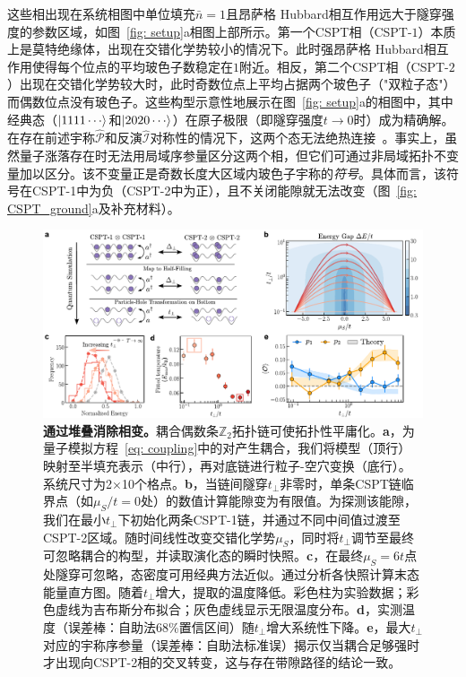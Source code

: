 \documentclass[preprint,superscriptaddress,floatfix, nofootinbib]{revtex4-2}
\begin{document}
这些相出现在系统相图中单位填充$\bar{n} =1$且昂萨格 Hubbard相互作用远大于隧穿强度的参数区域，如图~\ref{fig: setup}a相图上部所示。第一个CSPT相（CSPT-$1$）本质上是莫特绝缘体，出现在交错化学势较小的情况下。此时强昂萨格 Hubbard相互作用使得每个位点的平均玻色子数稳定在$1$附近。相反，第二个CSPT相（CSPT-$2$）出现在交错化学势较大时，此时奇数位点上平均占据两个玻色子（"双粒子态"）而偶数位点没有玻色子。这些构型示意性地展示在图~\ref{fig: setup}a的相图中，其中经典态（$\ket{1111\cdots}$和$\ket{2020\cdots}$）在原子极限（即隧穿强度$t\to 0$时）成为精确解。在存在前述宇称$\hat{\mathcal P}$和反演$\hat{\mathcal I}$对称性的情况下，这两个态无法绝热连接~\cite{Fuji2015}。事实上，虽然量子涨落存在时无法用局域序参量区分这两个相\cite{Fuji2015}，但它们可通过非局域拓扑不变量加以区分。该不变量正是奇数长度大区域内玻色子宇称的\textit{符号}。具体而言，该符号在CSPT-1中为负（CSPT-2中为正），且不关闭能隙就无法改变（图~\ref{fig: CSPT_ground}a及补充材料）。
\begin{figure}
    \centering
    \includegraphics[width=\textwidth]{figures/Fig_stacking.pdf}
    \caption{\textbf{通过堆叠消除相变。}耦合偶数条$\mathbb{Z}_2$拓扑链可使拓扑性平庸化。\textbf{a}，为量子模拟方程~\eqref{eq: coupling}中的对产生耦合，我们将模型（顶行）映射至半填充表示（中行），再对底链进行粒子-空穴变换（底行）。系统尺寸为2×10个格点。\textbf{b}，当链间隧穿$t_\perp$非零时，单条CSPT链临界点（如$\mu_S/t = 0$处）的数值计算能隙变为有限值。为探测该能隙，我们在最小$t_\perp$下初始化两条CSPT-1链，并通过不同中间值过渡至CSPT-2区域。随时间线性改变交错化学势$\mu_S$，同时将$t_\perp$调节至最终可忽略耦合的构型，并读取演化态的瞬时快照。\textbf{c}，在最终$\mu_S = 6t$点处隧穿可忽略，态密度可用经典方法近似。通过分析各快照计算末态能量直方图。随着$t_\perp$增大，提取的温度降低。彩色柱为实验数据；彩色虚线为吉布斯分布拟合；灰色虚线显示无限温度分布。\textbf{d}，实测温度（误差棒：自助法68\%置信区间）随$t_\perp$增大系统性下降。\textbf{e}，最大$t_\perp$对应的宇称序参量（误差棒：自助法标准误）揭示仅当耦合足够强时才出现向CSPT-2相的交叉转变，这与存在带隙路径的结论一致。}
    \label{fig: Coupled_CSPT}
\end{figure}
\end{document}
